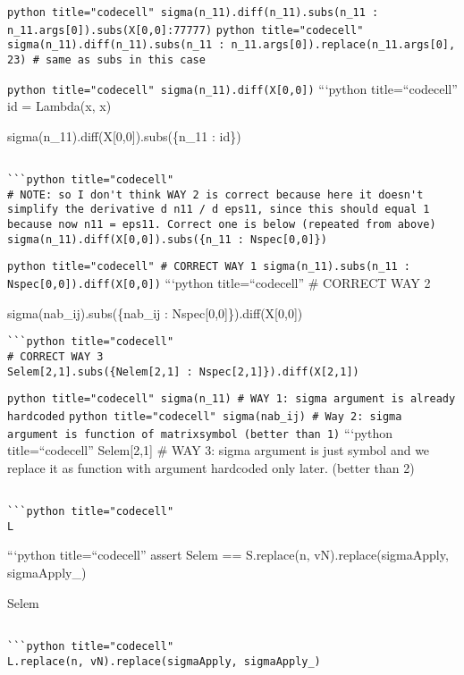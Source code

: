 \documentclass[
]{article}
\begin{document}
\texttt{python title="codecell" sigma(n_11).diff(n_11).subs({n_11 : n_11.args[0]}).subs({X[0,0]:77777})}
\texttt{python title="codecell" sigma(n_11).diff(n_11).subs({n_11 : n_11.args[0]}).replace(n_11.args[0], 23) # same as subs in this case}

\texttt{python title="codecell" sigma(n_11).diff(X[0,0])}
```python title=``codecell'' id = Lambda(x, x)

sigma(n\_11).diff(X{[}0,0{]}).subs(\{n\_11 : id\})

\begin{verbatim}

```python title="codecell"
# NOTE: so I don't think WAY 2 is correct because here it doesn't simplify the derivative d n11 / d eps11, since this should equal 1 because now n11 = eps11. Correct one is below (repeated from above)
sigma(n_11).diff(X[0,0]).subs({n_11 : Nspec[0,0]})
\end{verbatim}

\texttt{python title="codecell" # CORRECT WAY 1 sigma(n_11).subs({n_11 : Nspec[0,0]}).diff(X[0,0])}
```python title=``codecell'' \# CORRECT WAY 2

sigma(nab\_ij).subs(\{nab\_ij : Nspec{[}0,0{]}\}).diff(X{[}0,0{]})

\begin{verbatim}
```python title="codecell"
# CORRECT WAY 3
Selem[2,1].subs({Nelem[2,1] : Nspec[2,1]}).diff(X[2,1])
\end{verbatim}

\texttt{python title="codecell" sigma(n_11) # WAY 1: sigma argument is already hardcoded}
\texttt{python title="codecell" sigma(nab_ij) # Way 2: sigma argument is function of matrixsymbol (better than 1)}
```python title=``codecell'' Selem{[}2,1{]} \# WAY 3: sigma argument is
just symbol and we replace it as function with argument hardcoded only
later. (better than 2)

\begin{verbatim}

```python title="codecell"
L
\end{verbatim}

```python title=``codecell'' assert Selem == S.replace(n,
vN).replace(sigmaApply, sigmaApply\_)

Selem

\begin{verbatim}

```python title="codecell"
L.replace(n, vN).replace(sigmaApply, sigmaApply_)
\end{verbatim}
\end{document}
